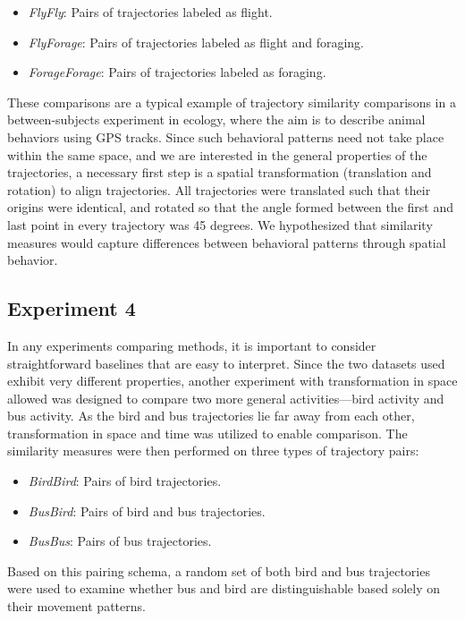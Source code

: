 \documentclass[10pt,letterpaper]{article}
\begin{document}
\begin{itemize}
\itemsep-1ex
\item \emph{FlyFly}: Pairs of trajectories labeled as flight.
\item \emph{FlyForage}: Pairs of trajectories labeled as flight and foraging.
\item \emph{ForageForage}: Pairs of trajectories labeled as foraging.
\end{itemize}

These comparisons are a typical example of trajectory similarity comparisons in a between-subjects experiment in ecology, where the aim is to describe animal behaviors using GPS tracks. Since such behavioral patterns need not take place within the same space, and we are interested in the general properties of the trajectories, a necessary first step is a spatial transformation (translation and rotation) to align trajectories. All trajectories were translated such that their origins were identical, and rotated so that the angle formed between the first and last point in every trajectory was 45 degrees. We hypothesized that similarity measures would capture differences between behavioral patterns through spatial behavior.


\subsection{Experiment 4}
\label{par:experiment_4}
In any experiments comparing methods, it is important to consider straightforward baselines that are easy to interpret. Since the two datasets used exhibit very different properties, another experiment with transformation in space allowed was designed to compare two more general activities---bird activity and bus activity.
As the bird and bus trajectories lie far away from each other, transformation in space and time was utilized to enable comparison. 
The similarity measures were then performed on three types of trajectory pairs:

\begin{itemize}
\itemsep-1ex
\item \emph{BirdBird}: Pairs of bird trajectories.
\item \emph{BusBird}: Pairs of bird and bus trajectories.
\item \emph{BusBus}: Pairs of bus trajectories.
\end{itemize}

Based on this pairing schema, a random set of both bird and bus trajectories were used to examine whether bus and bird are distinguishable based solely on their movement patterns.
\end{document}
